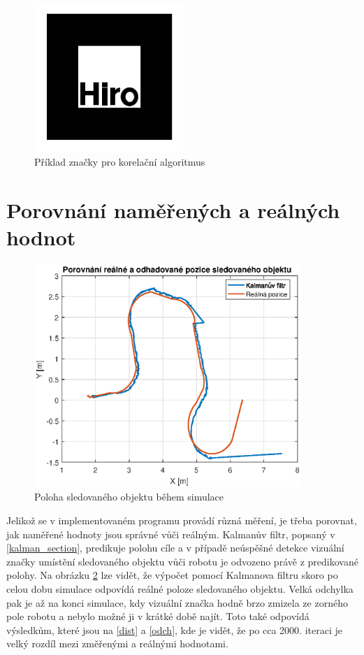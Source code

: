 \documentclass[twoside]{ctuthesis}
\theoremstyle{plain}
\theoremstyle{definition}
\theoremstyle{note}
\begin{document}
\begin{figure}
	\caption{Příklad značky pro korelační algoritmus}
	
	\label{hiro}
	\includegraphics[width=0.5\textwidth]{images/5/r1301.jpg}
\end{figure}

\section{Porovnání naměřených a reálných hodnot}

\begin{figure}[hbt]
	\caption{Poloha sledovaného objektu během simulace}
	
	\label{sled}
	\includegraphics[width=0.9\textwidth]{images/5/pos_pioner.eps}
\end{figure}

Jelikož se v implementovaném programu provádí různá měření, je třeba porovnat, jak naměřené hodnoty jsou správné vůči reálným. Kalmanův filtr, popsaný v \ref{kalman_section}, predikuje polohu cíle a v případě neúspěšné detekce vizuální značky umístění sledovaného objektu vůči robotu je odvozeno právě z predikované polohy. Na obrázku \ref{sled} lze vidět, že výpočet pomocí Kalmanova filtru skoro po celou dobu simulace odpovídá reálné poloze sledovaného objektu. Velká odchylka pak je až na konci simulace, kdy vizuální značka hodně brzo zmizela ze zorného pole robotu a nebylo možné ji v krátké době najít. Toto také odpovídá výsledkům, které jsou na \ref{dist} a \ref{odch}, kde je vidět, že po cca 2000. iteraci je velký rozdíl mezi změřenými a reálnými hodnotami.
\end{document}

